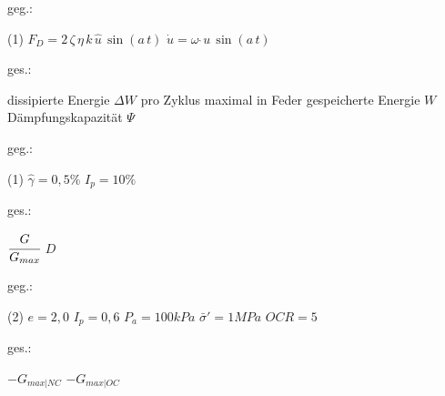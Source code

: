  \vspace{1em}

    \begin{minipage}[t]{.49\linewidth}
    geg.:
    \begin{tasks}(1)
      \task[] $F_D = 2\, \zeta\, \eta\, k\, \hat u\, \sin(a\, t)$
      \task[] $\dot{u} = \omega\,\hat\, u\, \sin(a\,t)$
    \end{tasks}
    \end{minipage}
    \begin{minipage}[t]{.49\linewidth}
    ges.:
        \begin{tasks}
            \task dissipierte Energie $\Delta W$ pro Zyklus
            \task maximal in Feder gespeicherte Energie $W$
            \task Dämpfungskapazität $\Psi$
        \end{tasks}
    \end{minipage}
\vspace{1cm}

  \vspace{1em}

     \begin{minipage}[t]{.49\linewidth}
    geg.:
    \begin{tasks}(1)
      \task[] $\hat\gamma = 0,5\%$
      \task[] $I_p = 10 \%$
    \end{tasks}
    \end{minipage}
    \begin{minipage}[t]{.49\linewidth}
    ges.:
        \begin{tasks}
            \task $\cfrac{G}{G_{max}}$
            \task $D$
        \end{tasks}
    \end{minipage}

    \begin{center}\end{center}

\vspace{1cm}

  \vspace{1em}

     \begin{minipage}[t]{.49\linewidth}
    geg.:
    \begin{tasks}(2)
      \task[] $e = 2,0$
    \task[] $I_p = 0,6$
    \task[] $P_a = 100 kPa$
    \task[] $\bar \sigma' = 1 MPa$
    \task[] $OCR = 5$
    \end{tasks}
    \end{minipage}
    \begin{minipage}[t]{.49\linewidth}
    ges.:
        \begin{tasks}
            \task $- G_{max|NC}$
            \task $- G_{max|OC}$
        \end{tasks}
    \end{minipage}
 \begin{center}\end{center}

